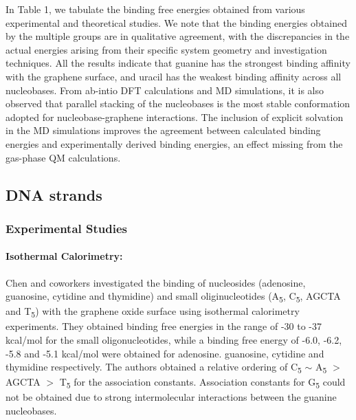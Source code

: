  
In Table 1, we tabulate the binding free energies obtained from various experimental and theoretical studies. We note that the binding energies obtained by the multiple groups are in qualitative agreement, with the discrepancies in the actual energies arising from their specific system geometry and investigation techniques. All the results indicate that guanine has the strongest binding affinity with the graphene surface, and uracil has the weakest binding affinity across all nucleobases. From ab-intio DFT calculations and MD simulations, it is also observed that parallel stacking of the nucleobases is the most stable conformation adopted for nucleobase-graphene interactions. The inclusion of explicit solvation in the MD simulations improves the agreement between calculated binding energies and experimentally derived binding energies, an effect missing from the gas-phase QM calculations. 

\subsection{DNA strands}
\subsubsection{Experimental Studies}
\paragraph{Isothermal Calorimetry:} Chen and coworkers investigated the binding of nucleosides (adenosine, guanosine, cytidine and thymidine) and small oliginucleotides (A\textsubscript{5}, C\textsubscript{5}, AGCTA and T\textsubscript{5}) with the graphene oxide surface using isothermal calorimetry experiments.\supercite{ranganathan_complex_2016} They obtained binding free energies in the range of -30 to -37 kcal/mol for the small oligonucleotides, while a binding free energy of -6.0, -6.2, -5.8 and -5.1 kcal/mol were obtained for adenosine. guanosine, cytidine and thymidine respectively. The authors obtained a relative ordering of C\textsubscript{5} $\sim$ A\textsubscript{5} $>$ AGCTA $>$ T\textsubscript{5} for the association constants. Association constants for G\textsubscript{5} could not be obtained due to strong intermolecular interactions between the guanine nucleobases.

